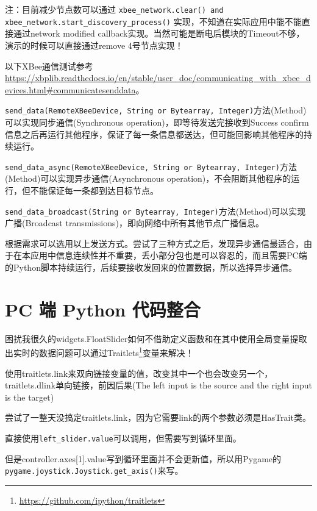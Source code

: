 注：目前减少节点数可以通过 \texttt{xbee_network.clear() and xbee_network.start_discovery_process()} 实现，不知道在实际应用中能不能直接通过network modified callback实现。当然可能是断电后模块的Timeout不够，演示的时候可以直接通过remove 4号节点实现！

以下XBee通信测试参考\url{https://xbplib.readthedocs.io/en/stable/user_doc/communicating_with_xbee_devices.html#communicatesenddata}。

\texttt{send_data(RemoteXBeeDevice, String or Bytearray, Integer)}方法(Method)可以实现同步通信(Synchronous operation)，即等待发送完接收到Success confirm信息之后再运行其他程序，保证了每一条信息都送达，但可能回影响其他程序的持续运行。


\texttt{send_data_async(RemoteXBeeDevice, String or Bytearray, Integer)}方法(Method)可以实现异步通信(Asynchronous operation)，不会阻断其他程序的运行，但不能保证每一条都到达目标节点。


\texttt{send_data_broadcast(String or Bytearray, Integer)}方法(Method)可以实现广播(Broadcast transmissions)，即向网络中所有其他节点广播信息。


根据需求可以选用以上发送方式。尝试了三种方式之后，发现异步通信最适合，由于在本应用中信息连续性并不重要，丢小部分包也是可以容忍的，而且需要PC端的Python脚本持续运行，后续要接收发回来的位置数据，所以选择异步通信。



\section{PC 端 Python 代码整合}

困扰我很久的widgets.FloatSlider如何不借助定义函数和在其中使用全局变量提取出实时的数据问题可以通过Traitlets\footnote{\url{https://github.com/ipython/traitlets}}变量来解决！

使用traitlets.link来双向链接变量的值，改变其中一个也会改变另一个，traitlets.dlink单向链接，前因后果(The left input is the source and the right input is the target)

尝试了一整天没搞定traitlets.link，因为它需要link的两个参数必须是HasTrait类。

直接使用\texttt{left_slider.value}可以调用，但需要写到循环里面。

但是controller.axes[1].value写到循环里面并不会更新值，所以用Pygame的\texttt{pygame.joystick.Joystick.get_axis()}来写。